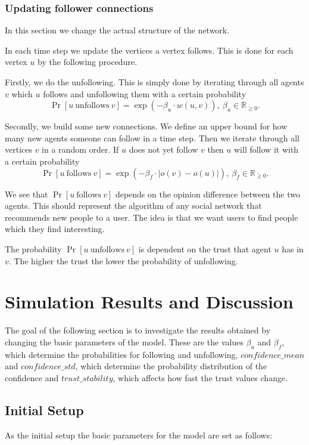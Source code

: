 \documentclass[11pt]{article}
\begin{document}
\subsubsection{Updating follower connections}\label{updatingfollower}
In this section we change the actual structure of the network.\par
In each time step we update the vertices a vertex follows. This is done for each vertex \(u\) by the following procedure.\par
Firstly, we do the unfollowing. This is simply done by iterating through all agents \(v\) which \(u\) follows and unfollowing them with a certain probability \[\Pr [u\ \mathrm{unfollows}\ v]=\exp (-\beta_u\cdot w(u,v)),\ \beta_u\in\mathbb{R}_{\geq0}.\]\par
Secondly, we build some new connections. We define an upper bound for how many new agents someone can follow in a time step. Then we iterate through all vertices \(v\) in a random order. If \(u\) does not yet follow \(v\) then \(u\) will follow it with a certain probability \[\Pr [u\ \mathrm{follows}\ v]=\exp (-\beta_f\cdot |o(v)-o(u)|),\ \beta_f\in\mathbb{R}_{\geq0}.\]\par
We see that \(\Pr [u\ \mathrm{follows}\ v]\) depends on the opinion difference between the two agents. This should represent the algorithm of any social network that recommends new people to a user. The idea is that we want users to find people which they find interesting.\par
The probability \(\Pr [u\ \mathrm{unfollows}\ v]\) is dependent on the trust that agent \(u\) has in \(v\). The higher the trust the lower the probability of unfollowing.

\section{Simulation Results and Discussion}
The goal of the following section is to investigate the results obtained by changing the basic parameters of the model. These are the values $\beta_u$ and $\beta_f$, which determine the probabilities for following and unfollowing, $confidence\_mean$ and $confidence\_std$, which determine the probability distribution of the confidence and $trust\_stability$, which affects how fast the trust values change.

\subsection{Initial Setup}
As the initial setup the basic parameters for the model are set as follows:
\end{document}
